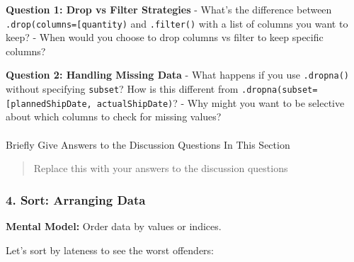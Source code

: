 \documentclass[
  letterpaper,
  DIV=11,
  numbers=noendperiod]{scrartcl}
\makeatletter
\let\oldparagraph\paragraph
\renewcommand{\paragraph}{
    \@ifstar
      \xxxParagraphStar
      \xxxParagraphNoStar
  }
\newcommand{\xxxParagraphStar}[1]{\oldparagraph*{#1}\mbox{}}
\newcommand{\xxxParagraphNoStar}[1]{\oldparagraph{#1}\mbox{}}
\makeatother
\begin{document}
\begin{tcolorbox}[enhanced jigsaw, colbacktitle=quarto-callout-important-color!10!white, opacitybacktitle=0.6, colframe=quarto-callout-important-color-frame, coltitle=black, left=2mm, titlerule=0mm, title=\textcolor{quarto-callout-important-color}{\faExclamation}\hspace{0.5em}{🤔 Discussion Questions: Drop Mental Model}, bottomtitle=1mm, opacityback=0, arc=.35mm, rightrule=.15mm, colback=white, breakable, bottomrule=.15mm, toprule=.15mm, toptitle=1mm, leftrule=.75mm]

\textbf{Question 1: Drop vs Filter Strategies} - What's the difference
between
\texttt{.drop(columns={[}\textquotesingle{}quantity\textquotesingle{}{]})}
and \texttt{.filter()} with a list of columns you want to keep? - When
would you choose to drop columns vs filter to keep specific columns?

\textbf{Question 2: Handling Missing Data} - What happens if you use
\texttt{.dropna()} without specifying \texttt{subset}? How is this
different from
\texttt{.dropna(subset={[}\textquotesingle{}plannedShipDate\textquotesingle{},\ \textquotesingle{}actualShipDate\textquotesingle{}{]})}?
- Why might you want to be selective about which columns to check for
missing values?

\end{tcolorbox}

\paragraph{Briefly Give Answers to the Discussion Questions In This
Section}\label{briefly-give-answers-to-the-discussion-questions-in-this-section-2}

\begin{quote}
Replace this with your answers to the discussion questions
\end{quote}

\subsubsection{4. Sort: Arranging Data}\label{sort-arranging-data}

\textbf{Mental Model:} Order data by values or indices.

Let's sort by lateness to see the worst offenders:
\end{document}
